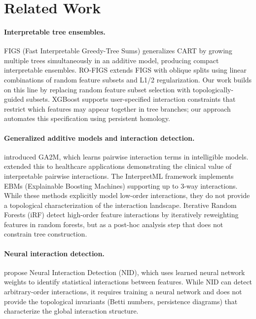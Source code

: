 \documentclass[11pt,letterpaper]{article}
\begin{document}
\section{Related Work}
\label{sec:related}

\paragraph{Interpretable tree ensembles.}
FIGS (Fast Interpretable Greedy-Tree Sums) \citep{Tan2022} generalizes CART by growing multiple trees simultaneously in an additive model, producing compact interpretable ensembles. RO-FIGS \citep{Matjasec2025} extends FIGS with oblique splits using linear combinations of random feature subsets and L1/2 regularization. Our work builds on this line by replacing random feature subset selection with topologically-guided subsets. XGBoost \citep{Chen2016} supports user-specified interaction constraints that restrict which features may appear together in tree branches; our approach automates this specification using persistent homology.

\paragraph{Generalized additive models and interaction detection.}
\citet{Lou2013} introduced GA2M, which learns pairwise interaction terms in intelligible models. \citet{Caruana2015} extended this to healthcare applications demonstrating the clinical value of interpretable pairwise interactions. The InterpretML framework \citep{Nori2019} implements EBMs (Explainable Boosting Machines) supporting up to 3-way interactions. While these methods explicitly model low-order interactions, they do not provide a topological characterization of the interaction landscape. Iterative Random Forests (iRF) \citep{Kumbier2018} detect high-order feature interactions by iteratively reweighting features in random forests, but as a post-hoc analysis step that does not constrain tree construction.

\paragraph{Neural interaction detection.}
\citet{Tsang2020} propose Neural Interaction Detection (NID), which uses learned neural network weights to identify statistical interactions between features. While NID can detect arbitrary-order interactions, it requires training a neural network and does not provide the topological invariants (Betti numbers, persistence diagrams) that characterize the global interaction structure.
\end{document}
